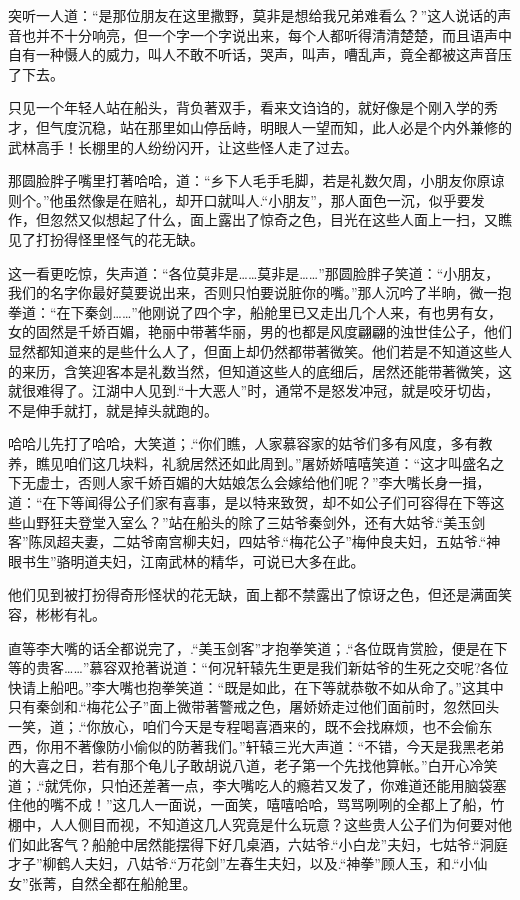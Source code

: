 \documentclass[12pt,oneside]{book}
\begin{document}
突听一人道：``是那位朋友在这里撒野，莫非是想给我兄弟难看么？''这人说话的声音也并不十分响亮，但一个字一个字说出来，每个人都听得清清楚楚，而且语声中自有一种慑人的威力，叫人不敢不听话，哭声，叫声，嘈乱声，竟全都被这声音压了下去。

只见一个年轻人站在船头，背负著双手，看来文诌诌的，就好像是个刚入学的秀才，但气度沉稳，站在那里如山停岳峙，明眼人一望而知，此人必是个内外兼修的武林高手！长棚里的人纷纷闪开，让这些怪人走了过去。

那圆脸胖子嘴里打著哈哈，道：``乡下人毛手毛脚，若是礼数欠周，小朋友你原谅则个。''他虽然像是在赔礼，却开口就叫人.``小朋友''，那人面色一沉，似乎要发作，但忽然又似想起了什么，面上露出了惊奇之色，目光在这些人面上一扫，又瞧见了打扮得怪里怪气的花无缺。

这一看更吃惊，失声道：``各位莫非是\ldots\ldots 莫非是\ldots\ldots{}''那圆脸胖子笑道：``小朋友，我们的名字你最好莫要说出来，否则只怕要说脏你的嘴。''那人沉吟了半晌，微一抱拳道：``在下秦剑\ldots\ldots{}''他刚说了四个字，船舱里已又走出几个人来，有也男有女，女的固然是千娇百媚，艳丽中带著华丽，男的也都是风度翩翩的浊世佳公子，他们显然都知道来的是些什么人了，但面上却仍然都带著微笑。他们若是不知道这些人的来历，含笑迎客本是礼数当然，但知道这些人的底细后，居然还能带著微笑，这就很难得了。江湖中人见到.``十大恶人''时，通常不是怒发冲冠，就是咬牙切齿，不是伸手就打，就是掉头就跑的。

哈哈儿先打了哈哈，大笑道；.``你们瞧，人家慕容家的姑爷们多有风度，多有教养，瞧见咱们这几块料，礼貌居然还如此周到。''屠娇娇嘻嘻笑道：``这才叫盛名之下无虚士，否则人家千娇百媚的大姑娘怎么会嫁给他们呢？''李大嘴长身一揖，道：``在下等闻得公子们家有喜事，是以特来致贺，却不如公子们可容得在下等这些山野狂夫登堂入室么？''站在船头的除了三姑爷秦剑外，还有大姑爷.``美玉剑客''陈凤超夫妻，二姑爷南宫柳夫妇，四姑爷.``梅花公子''梅仲良夫妇，五姑爷.``神眼书生''骆明道夫妇，江南武林的精华，可说已大多在此。

他们见到被打扮得奇形怪状的花无缺，面上都不禁露出了惊讶之色，但还是满面笑容，彬彬有礼。

直等李大嘴的话全都说完了，.``美玉剑客''才抱拳笑道；.``各位既肯赏脸，便是在下等的贵客\ldots\ldots{}''慕容双抢著说道：``何况轩辕先生更是我们新姑爷的生死之交呢?各位快请上船吧。''李大嘴也抱拳笑道：``既是如此，在下等就恭敬不如从命了。''这其中只有秦剑和.``梅花公子''面上微带著警戒之色，屠娇娇走过他们面前时，忽然回头一笑，道；.``你放心，咱们今天是专程喝喜酒来的，既不会找麻烦，也不会偷东西，你用不著像防小偷似的防著我们。''轩辕三光大声道：``不错，今天是我黑老弟的大喜之日，若有那个龟儿子敢胡说八道，老子第一个先找他算帐。''白开心冷笑道；.``就凭你，只怕还差著一点，李大嘴吃人的瘾若又发了，你难道还能用脑袋塞住他的嘴不成！''这几人一面说，一面笑，嘻嘻哈哈，骂骂咧咧的全都上了船，竹棚中，人人侧目而视，不知道这几人究竟是什么玩意？这些贵人公子们为何要对他们如此客气？船舱中居然能摆得下好几桌酒，六姑爷.``小白龙''夫妇，七姑爷.``洞庭才子''柳鹤人夫妇，八姑爷.``万花剑''左春生夫妇，以及.``神拳''顾人玉，和.``小仙女''张菁，自然全都在船舱里。
\end{document}
